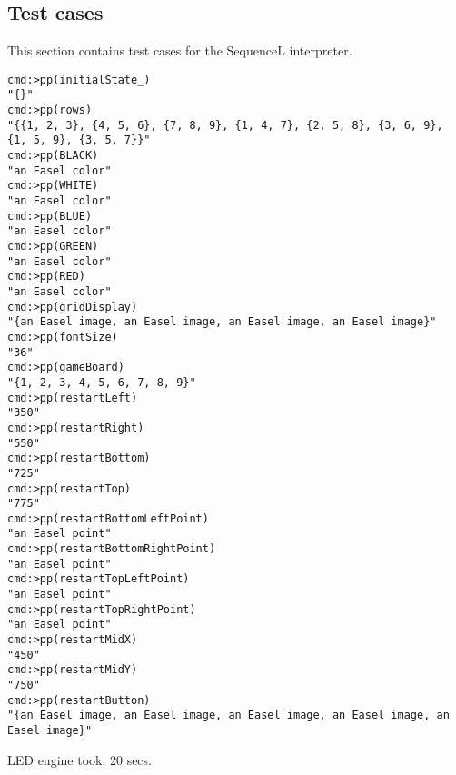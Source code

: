 \documentclass{../src/led_doc}
\begin{document}
\begin{ledCmnt}
\section{Test cases}

This section contains test cases for the SequenceL interpreter.

\begin{verbatim}
cmd:>pp(initialState_)
"{}"
cmd:>pp(rows)
"{{1, 2, 3}, {4, 5, 6}, {7, 8, 9}, {1, 4, 7}, {2, 5, 8}, {3, 6, 9}, {1, 5, 9}, {3, 5, 7}}"
cmd:>pp(BLACK)
"an Easel color"
cmd:>pp(WHITE)
"an Easel color"
cmd:>pp(BLUE)
"an Easel color"
cmd:>pp(GREEN)
"an Easel color"
cmd:>pp(RED)
"an Easel color"
cmd:>pp(gridDisplay)
"{an Easel image, an Easel image, an Easel image, an Easel image}"
cmd:>pp(fontSize)
"36"
cmd:>pp(gameBoard)
"{1, 2, 3, 4, 5, 6, 7, 8, 9}"
cmd:>pp(restartLeft)
"350"
cmd:>pp(restartRight)
"550"
cmd:>pp(restartBottom)
"725"
cmd:>pp(restartTop)
"775"
cmd:>pp(restartBottomLeftPoint)
"an Easel point"
cmd:>pp(restartBottomRightPoint)
"an Easel point"
cmd:>pp(restartTopLeftPoint)
"an Easel point"
cmd:>pp(restartTopRightPoint)
"an Easel point"
cmd:>pp(restartMidX)
"450"
cmd:>pp(restartMidY)
"750"
cmd:>pp(restartButton)
"{an Easel image, an Easel image, an Easel image, an Easel image, an Easel image}"
\end{verbatim}

LED engine took: 20 secs.
\end{ledCmnt}
\end{document}
